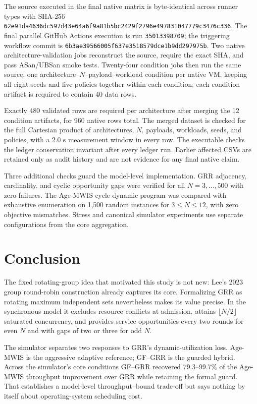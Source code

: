\documentclass[10pt,journal]{IEEEtran}
\begin{document}
The source executed in the final native matrix is byte-identical across runner types with SHA-256 \texttt{62e91da4\allowbreak{}636dc597\allowbreak{}d43e64a6\allowbreak{}f9a81b5b\allowbreak{}c2429f27\allowbreak{}96e49783\allowbreak{}1047779c\allowbreak{}3476c336}. The final parallel GitHub Actions execution is run \texttt{35013398709}; the triggering workflow commit is \texttt{6b3ae395\allowbreak{}66005f63\allowbreak{}7e351857\allowbreak{}9dce1b9d\allowbreak{}d297975b}. Two native architecture-validation jobs reconstruct the source, require the exact SHA, and pass ASan/UBSan smoke tests. Twenty-four condition jobs then run the same source, one architecture--$N$--payload--workload condition per native VM, keeping all eight seeds and five policies together within each condition; each condition artifact is required to contain 40 data rows.

Exactly 480 validated rows are required per architecture after merging the 12 condition artifacts, for 960 native rows total. The merged dataset is checked for the full Cartesian product of architectures, $N$, payloads, workloads, seeds, and policies, with a 2.0 s measurement window in every row. The executable checks the ledger conservation invariant after every ledger run. Earlier affected CSVs are retained only as audit history and are not evidence for any final native claim.

Three additional checks guard the model-level implementation. GRR adjacency, cardinality, and cyclic opportunity gaps were verified for all $N=3,\ldots,500$ with zero failures. The Age-MWIS cycle dynamic program was compared with exhaustive enumeration on 1,500 random instances for $3\le N\le12$, with zero objective mismatches. Stress and canonical simulator experiments use separate configurations from the core aggregation.

\section{Conclusion}
The fixed rotating-group idea that motivated this study is not new: Lee's 2023 group round-robin construction already captures its core. Formalizing GRR as rotating maximum independent sets nevertheless makes its value precise. In the synchronous model it excludes resource conflicts at admission, attains $\lfloor N/2\rfloor$ saturated concurrency, and provides service opportunities every two rounds for even $N$ and with gaps of two or three for odd $N$.

The simulator separates two responses to GRR's dynamic-utilization loss. Age-MWIS is the aggressive adaptive reference; GF--GRR is the guarded hybrid. Across the simulator's core conditions GF--GRR recovered 79.3--99.7\% of the Age-MWIS throughput improvement over GRR while retaining the formal guard. That establishes a model-level throughput--bound trade-off but says nothing by itself about operating-system scheduling cost.
\end{document}
